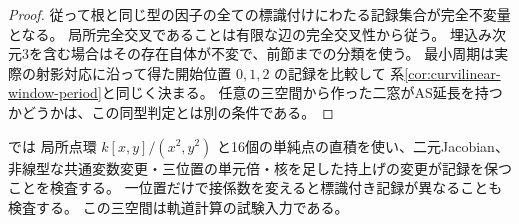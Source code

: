\begin{proof}
従って根と同じ型の因子の全ての標識付けにわたる記録集合が完全不変量となる。
局所完全交叉であることは有限な辺の完全交叉性から従う。
埋込み次元3を含む場合はその存在自体が不変で、前節までの分類を使う。
最小周期は実際の射影対応に沿って得た開始位置 $0,1,2$ の記録を比較して
系\ref{cor:curvilinear-window-period}と同じく決まる。
任意の三空間から作った二窓がAS延長を持つかどうかは、この同型判定とは別の条件である。
\end{proof}

 では
局所点環 $k[x,y]/(x^2,y^2)$ と16個の単純点の直積を使い、二元Jacobian、
非線型な共通変数変更・三位置の単元倍・核を足した持上げの変更が記録を保つことを検査する。
一位置だけで接係数を変えると標識付き記録が異なることも検査する。
この三空間は軌道計算の試験入力である。
